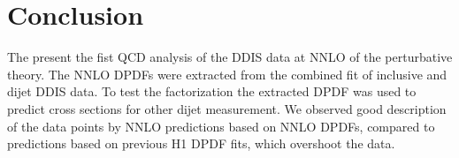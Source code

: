 \documentclass{PoS}
\begin{document}
\section{Conclusion}
The present the fist QCD analysis of the DDIS data at NNLO of the perturbative theory.
The NNLO DPDFs were extracted from the combined fit of inclusive and dijet DDIS data.
To test the factorization the extracted DPDF was used to predict cross sections for other dijet measurement.
We observed good description of the data points by NNLO predictions based on NNLO DPDFs, compared to predictions based on previous H1 DPDF fits, which overshoot the data.




\end{document}
